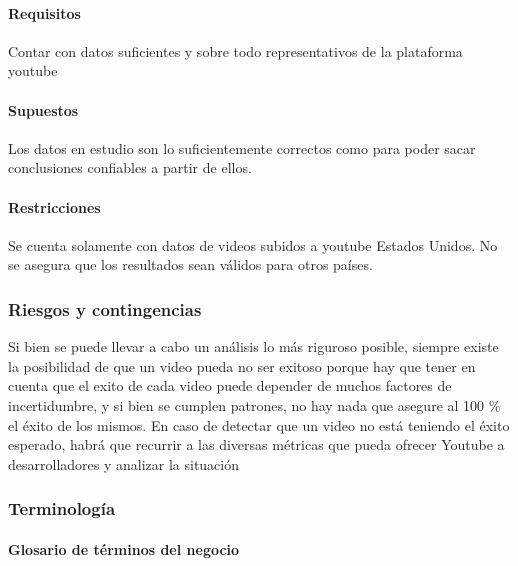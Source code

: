         \paragraph{Requisitos}
        Contar con datos suficientes y sobre todo representativos de la
        plataforma youtube
        \paragraph{Supuestos}
        Los datos en estudio son lo suficientemente correctos como para poder
        sacar conclusiones confiables a partir de ellos.
        \paragraph{Restricciones}
        Se cuenta solamente con datos de videos subidos a youtube
        Estados Unidos. No se asegura que los resultados sean válidos para
        otros países.

    \subsubsection{Riesgos y contingencias}

        Si bien se puede llevar a cabo un análisis lo más riguroso posible, siempre existe la
        posibilidad de que un video pueda no ser exitoso porque hay que tener en
        cuenta que el exito de cada video puede depender de muchos factores de
        incertidumbre, y si bien se cumplen patrones, no hay nada que asegure al
        100 \% el éxito de los mismos.
        En caso de detectar que un video no está teniendo el éxito esperado,
        habrá que recurrir a las diversas métricas que pueda ofrecer Youtube a
        desarrolladores y analizar la situación

    \subsubsection{Terminología}

        \paragraph{Glosario de términos del negocio}

